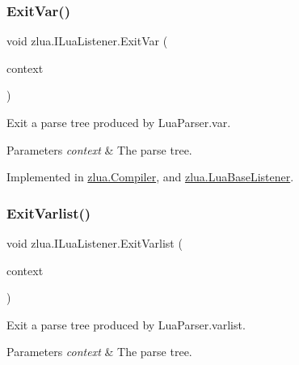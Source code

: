 \subsubsection{\texorpdfstring{Exit\+Var()}{ExitVar()}}
{\footnotesize\ttfamily void zlua.\+I\+Lua\+Listener.\+Exit\+Var (\begin{DoxyParamCaption}\item[{\mbox{[}\+Not\+Null\mbox{]} \mbox{\hyperlink{classzlua_1_1_lua_parser_1_1_var_context}{Lua\+Parser.\+Var\+Context}}}]{context }\end{DoxyParamCaption})}



Exit a parse tree produced by Lua\+Parser.\+var. 


\begin{DoxyParams}{Parameters}
{\em context} & The parse tree.\\
\hline
\end{DoxyParams}


Implemented in \mbox{\hyperlink{classzlua_1_1_compiler_ac7ccb4c59166208993e3a32b470cc7bf}{zlua.\+Compiler}}, and \mbox{\hyperlink{classzlua_1_1_lua_base_listener_a37244bd0d8813ac29d8b841496ff4a75}{zlua.\+Lua\+Base\+Listener}}.

\mbox{\label{interfacezlua_1_1_i_lua_listener_a25fcca7c6476226f6faf33597226f9b3}} 
\subsubsection{\texorpdfstring{Exit\+Varlist()}{ExitVarlist()}}
{\footnotesize\ttfamily void zlua.\+I\+Lua\+Listener.\+Exit\+Varlist (\begin{DoxyParamCaption}\item[{\mbox{[}\+Not\+Null\mbox{]} \mbox{\hyperlink{classzlua_1_1_lua_parser_1_1_varlist_context}{Lua\+Parser.\+Varlist\+Context}}}]{context }\end{DoxyParamCaption})}



Exit a parse tree produced by Lua\+Parser.\+varlist. 


\begin{DoxyParams}{Parameters}
{\em context} & The parse tree.\\
\hline
\end{DoxyParams}


